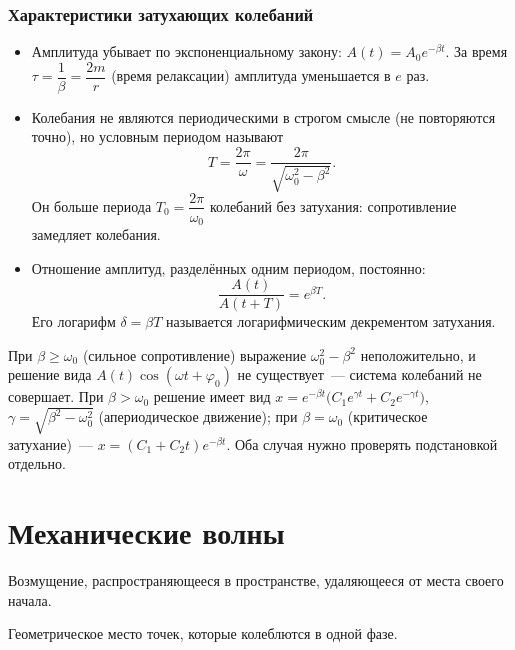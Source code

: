 \documentclass[12pt]{article}
\begin{document}
	\subsubsection{Характеристики затухающих колебаний}
	
	\begin{itemize}
		\item Амплитуда убывает по экспоненциальному закону: $A(t) = A_0 e^{-\beta t}$. За время $\tau = \dfrac{1}{\beta} = \dfrac{2m}{r}$ (время релаксации) амплитуда уменьшается в $e$ раз.
		\item Колебания не являются периодическими в строгом смысле (не повторяются точно), но условным периодом называют
		\[
			T = \dfrac{2\pi}{\omega} = \dfrac{2\pi}{\sqrt{\omega_0^2 - \beta^2}}.
		\]
		Он больше периода $T_0 = \dfrac{2\pi}{\omega_0}$ колебаний без затухания: сопротивление замедляет колебания.
		\item Отношение амплитуд, разделённых одним периодом, постоянно:
		\[
			\dfrac{A(t)}{A(t + T)} = e^{\beta T}.
		\]
		Его логарифм $\delta = \beta T$ называется логарифмическим декрементом затухания.
	\end{itemize}
	
	\begin{note}
		При $\beta \geqslant \omega_0$ (сильное сопротивление) выражение $\omega_0^2 - \beta^2$ неположительно, и решение вида $A(t)\cos(\omega t + \varphi_0)$ не существует~--- система колебаний не совершает. При $\beta > \omega_0$ решение имеет вид $x = e^{-\beta t}\bigl( C_1 e^{\gamma t} + C_2 e^{-\gamma t} \bigr)$, $\gamma = \sqrt{\beta^2 - \omega_0^2}$ (апериодическое движение); при $\beta = \omega_0$ (критическое затухание)~--- $x = (C_1 + C_2 t)e^{-\beta t}$. Оба случая нужно проверять подстановкой отдельно.
	\end{note}

	\section{Механические волны}

	\begin{definition}
		Возмущение, распространяющееся в пространстве, удаляющееся от места своего начала.
	\end{definition}

	\begin{definition}
		Геометрическое место точек, которые колеблются в одной фазе.
	\end{definition}
\end{document}

